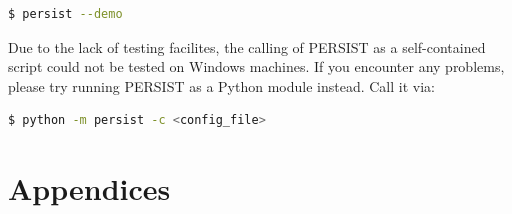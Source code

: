 \documentclass[
	a4paper, %
	12pt, %
]{persist}
\begin{document}
\begin{lstlisting}[language=bash]
	$ persist --demo
\end{lstlisting}

\begin{note}
	Due to the lack of testing facilites, the calling of PERSIST as a self-contained script could not be tested on Windows machines. If you encounter any problems, please try running PERSIST as a Python module instead. Call it via:
	\begin{lstlisting}[language=bash]
	$ python -m persist -c <config_file>
	\end{lstlisting}
\end{note}


\newpage


\begin{twothirdswidth} %
	\printbibliography[title=Reference List] %
\end{twothirdswidth}


\newpage

\section*{Appendices}
\end{document}
